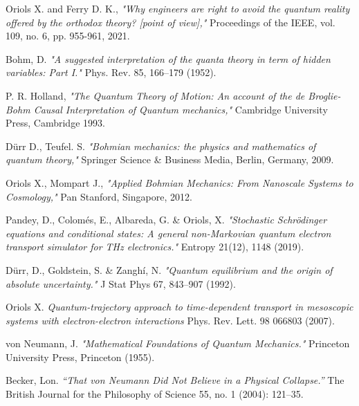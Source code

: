 \documentclass[11pt, a4paper]{article} %
\begin{document}
\newpage
\begin{thebibliography}{1}
{\footnotesize 

Oriols X. and Ferry D. K., {\em "Why engineers are right to avoid the quantum reality offered by the orthodox theory? [point of view],"} Proceedings of the IEEE, vol. 109, no. 6, pp. 955-961, 2021.

Bohm, D. {\em "A suggested interpretation of the quanta theory in term of hidden variables: Part I."} Phys. Rev. 85, 166–179 (1952).

P. R. Holland, {\em "The Quantum Theory of Motion: An account of the de Broglie-Bohm Causal Interpretation of Quantum
mechanics,"} Cambridge University Press, Cambridge 1993.

Dürr D., Teufel. S. {\em "Bohmian mechanics: the physics and mathematics of quantum theory,"} Springer Science \& Business Media, Berlin, Germany, 2009.

	Oriols X., Mompart J., {\em "Applied Bohmian Mechanics: From Nanoscale Systems to Cosmology,"} Pan Stanford, Singapore, 2012.
	
Pandey, D., Colomés, E., Albareda, G. \& Oriols, X. {\em "Stochastic Schrödinger equations and conditional states: A general non-Markovian quantum electron transport simulator for THz electronics."} Entropy 21(12), 1148 (2019).

Dürr, D., Goldstein, S. \& Zanghí, N. {\em "Quantum equilibrium and the origin of absolute uncertainty."} J Stat Phys 67, 843–907 (1992).

Oriols X. {\em Quantum-trajectory approach to time-dependent transport in mesoscopic systems with electron-electron interactions} Phys. Rev. Lett. 98 066803 (2007).


von Neumann, J. {\em "Mathematical Foundations of Quantum Mechanics."} Princeton University Press, Princeton (1955).

Becker, Lon. {\em “That von Neumann Did Not Believe in a Physical Collapse.”} The British Journal for the Philosophy of Science 55, no. 1 (2004): 121–35.


}
\end{thebibliography}
\end{document}
